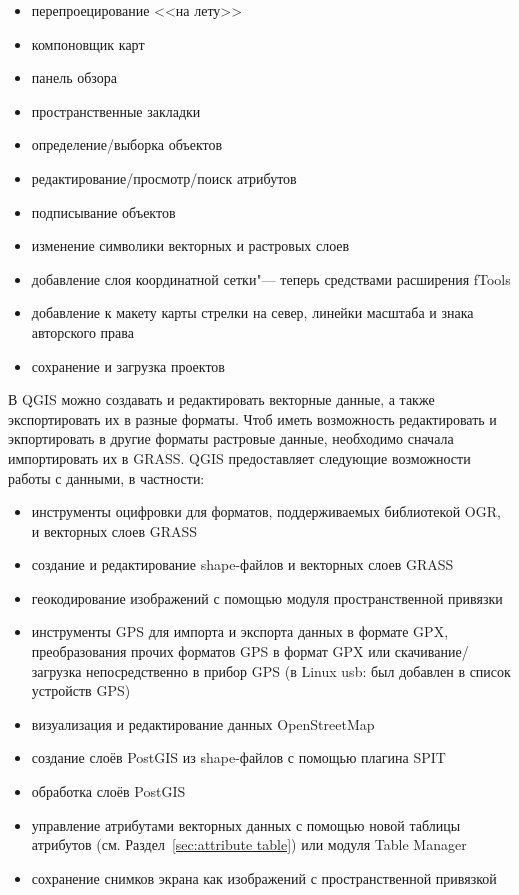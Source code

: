 \begin{itemize}[label=--]
\item перепроецирование <<на лету>>
\item компоновщик карт
\item панель обзора
\item пространственные закладки
\item определение/выборка объектов
\item редактирование/просмотр/поиск атрибутов
\item подписывание объектов
\item изменение символики векторных и растровых слоев
\item добавление слоя координатной сетки"--- теперь средствами
  расширения fTools
\item добавление к макету карты стрелки на север, линейки масштаба
и знака авторского права
\item сохранение и загрузка проектов
\end{itemize}


В QGIS можно создавать и редактировать векторные данные, а также
экспортировать их в разные форматы. Чтоб иметь возможность редактировать
и экпортировать в другие форматы растровые данные, необходимо
сначала импортировать их в GRASS. QGIS предоставляет следующие возможности
работы с данными, в частности:

\begin{itemize}[label=--]
\item инструменты оцифровки для форматов, поддерживаемых библиотекой OGR,
и векторных слоев GRASS
\item создание и редактирование shape-файлов и векторных слоев GRASS
\item геокодирование изображений с помощью модуля пространственной
привязки
\item инструменты GPS для импорта и экспорта данных в формате GPX,
преобразования прочих форматов GPS в формат GPX или скачивание/загрузка
непосредственно в прибор GPS (в Linux usb: был добавлен в список
устройств GPS)
\item визуализация и редактирование данных OpenStreetMap
\item создание слоёв PostGIS из shape-файлов с помощью плагина SPIT
\item обработка слоёв PostGIS
\item управление атрибутами векторных данных с помощью новой таблицы
атрибутов (см. Раздел~\ref{sec:attribute table}) или модуля Table Manager
\item сохранение снимков экрана как изображений с пространственной
привязкой
\end{itemize}

